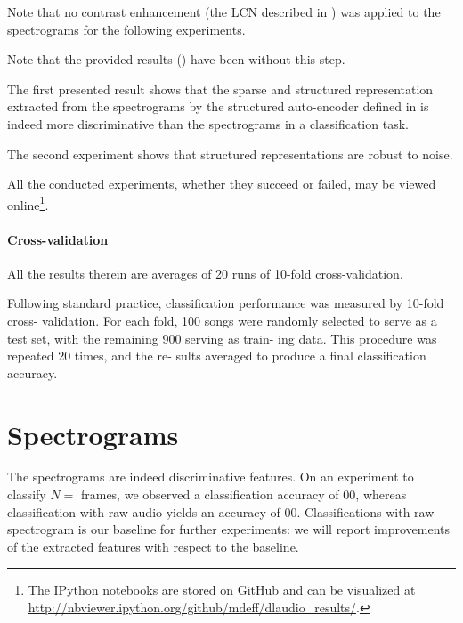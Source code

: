 Note that no contrast enhancement (the \gls{LCN} described in ) was applied to the spectrograms for the following experiments.

Note that the provided results () have been  without this step.

The first presented result shows that the sparse and structured representation extracted from the spectrograms by the structured auto-encoder defined in  is indeed more discriminative than the spectrograms in a classification task.

The second experiment shows that structured representations are robust to noise.

All the conducted experiments, whether they succeed or failed, may be viewed online\footnote{The IPython notebooks are stored on GitHub and can be visualized at \url{http://nbviewer.ipython.org/github/mdeff/dlaudio_results/}.}.


\paragraph{Cross-validation}
All the results therein are averages of 20 runs of 10-fold cross-validation.

Following standard practice,
classification performance was measured by 10-fold cross-
validation. For each fold, 100 songs were randomly selected
to serve as a test set, with the remaining 900 serving as train-
ing data. This procedure was repeated 20 times, and the re-
sults averaged to produce a final classification accuracy.

\section{Spectrograms} \label{sec:spectrograms}

The spectrograms are indeed discriminative features. On an experiment to classify $N = $ frames, we observed a classification accuracy of $00$, whereas classification with raw audio yields an accuracy of $00$. Classifications with raw spectrogram is our baseline for further experiments: we will report improvements of the extracted features with respect to the baseline.


